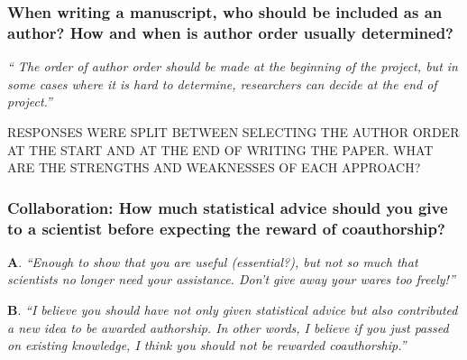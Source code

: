 \documentclass[12pt]{beamer}
\newcommand\ans[1]{{\it ``#1''}}
\newcommand\gap{\vspace{5mm}}
\begin{document}
\begin{frame} %

\frametitle{When writing a manuscript, who should be included as an author? How and when is author order usually determined? }

\ans{ The order of author order should be made at the beginning of the project, but in some cases where it is hard to determine, researchers can decide at the end of project.}

\gap

RESPONSES WERE SPLIT BETWEEN SELECTING THE AUTHOR ORDER AT THE START AND AT THE END OF WRITING THE PAPER. WHAT ARE THE STRENGTHS AND WEAKNESSES OF EACH APPROACH?






\end{frame}
\begin{frame} %
  \frametitle{Collaboration: How much statistical advice should you give to a scientist before expecting the reward of coauthorship?}

  {\bf A}. \ans{Enough to show that you are useful (essential?),  but not so much that scientists no longer need your assistance.  Don’t give away your wares too freely!}

  \gap
  
{\bf B}. \ans{I believe you should have not only given statistical advice but also contributed a new idea to be awarded authorship.  In other words, I believe if you just passed on existing knowledge, I think you should not be rewarded coauthorship.}

\end{frame}
\end{document}

